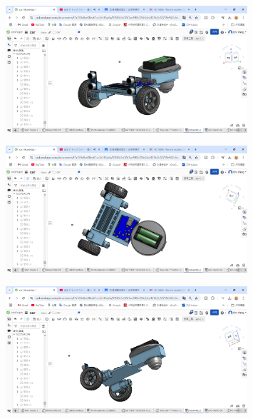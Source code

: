 \documentclass[a4paper,12pt]{article}
\begin{document}
\begin{center}\begin{figure}[H]\centering\includegraphics[width=0.8\textwidth]{./model_images/c1.png}\end{figure}\FloatBarrier\end{center}
\begin{center}\begin{figure}[H]\centering\includegraphics[width=0.8\textwidth]{./model_images/c2.png}\end{figure}\FloatBarrier\end{center}
\begin{center}\begin{figure}[H]\centering\includegraphics[width=0.8\textwidth]{./model_images/c3.png}\end{figure}\FloatBarrier\end{center}
\end{document}
